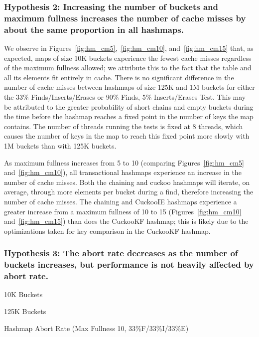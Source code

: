 \subsubsection{Hypothesis 2: Increasing the number of buckets and maximum fullness increases the number of cache misses by about the same proportion in all hashmaps.}

We observe in Figures~\ref{fig:hm_cm5},~\ref{fig:hm_cm10}, and~\ref{fig:hm_cm15} that, as expected, maps of size 10K buckets experience the fewest cache misses regardless of the maximum fullness allowed; we attribute this to the fact that the table and all its elements fit entirely in cache. There is no significant difference in the number of cache misses between hashmaps of size 125K and 1M buckets for either the 33\% Finds/Inserts/Erases  or 90\% Finds, 5\% Inserts/Erases Test. This may be attributed to the greater probability of short chains and empty buckets during the time before the hashmap reaches a fixed point in the number of keys the map contains. The number of threads running the tests is fixed at 8 threads, which causes the number of keys in the map to reach this fixed point more slowly with 1M buckets than with 125K buckets.

As maximum fullness increases from 5 to 10 (comparing Figures~\ref{fig:hm_cm5} and~\ref{fig:hm_cm10}), all transactional hashmaps experience an increase in the number of cache misses. Both the chaining and cuckoo hashmaps will iterate, on average, through more elements per bucket during a find, therefore increasing the number of cache misses. The chaining and CuckooIE hashmaps experience a greater increase from a maximum fullness of 10 to 15 (Figures~\ref{fig:hm_cm10} and~\ref{fig:hm_cm15}) than does the CuckooKF hashmap; this is likely due to the optimizations taken for key comparison in the CuckooKF hashmap.

\subsubsection{Hypothesis 3: The abort rate decreases as the number of buckets increases, but performance is not heavily affected by abort rate.}

    \begin{table}[t]
    \centering
	\singlespace
        \begin{minipage}{0.45\textwidth}
        \centering
        
        \caption*{10K Buckets}
        \end{minipage}
        \begin{minipage}{0.45\textwidth}
        \centering
        
        \caption*{125K Buckets}
        \end{minipage}
        \caption{Hashmap Abort Rate (Max Fullness 10, 33\%F/33\%I/33\%E)}
		\label{tab:hm_aborts}
    \end{table}

